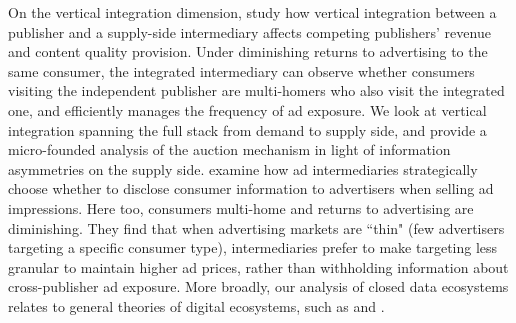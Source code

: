 \documentclass[11pt]{article}
\theoremstyle{plain}
\theoremstyle{definition}
\theoremstyle{plain}
\theoremstyle{plain}
\theoremstyle{plain}
\theoremstyle{plain}
\numberwithin{equation}{section}
\begin{document}
\noindent On the vertical integration dimension, \textcite{dannunzioDigitalEcosystemsAdtech2024} study how vertical integration between a publisher and a supply-side intermediary affects competing publishers' revenue and content quality provision. Under diminishing returns to advertising to the same consumer, the integrated intermediary can observe whether consumers visiting the independent publisher are multi-homers who also visit the integrated one, and efficiently manages the frequency of ad exposure. We look at vertical integration spanning the full stack from demand to supply side, and provide a micro-founded analysis of the auction mechanism in light of information asymmetries on the supply side. \textcite{dannunzioIntermediariesOnlineAdvertising2024} examine how ad intermediaries strategically choose whether to disclose consumer information to advertisers when selling ad impressions. Here too, consumers multi-home and returns to advertising are diminishing. They find that when advertising markets are ``thin" (few advertisers targeting a specific consumer type), intermediaries prefer to make targeting less granular to maintain higher ad prices, rather than withholding information about cross-publisher ad exposure. More broadly, our analysis of closed data ecosystems relates to general theories of digital ecosystems, such as \textcite{rhodesDigitalEcosystemsData2024} and \textcite{heidhuesTheoryDigitalEcosystems2024}. \par
\vspace{8mm}

\iffalse
\end{document}
